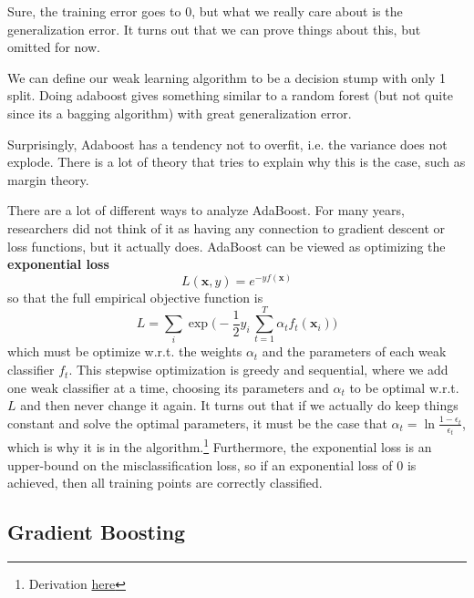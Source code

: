 \documentclass{article}
\begin{document}
    Sure, the training error goes to $0$, but what we really care about is the generalization error. It turns out that we can prove things about this, but omitted for now. 

    \begin{example}
      We can define our weak learning algorithm to be a decision stump with only 1 split. Doing adaboost gives something similar to a random forest (but not quite since its a bagging algorithm) with great generalization error. 
    \end{example}

    Surprisingly, Adaboost has a tendency not to overfit, i.e. the variance does not explode. There is a lot of theory that tries to explain why this is the case, such as margin theory. 

    There are a lot of different ways to analyze AdaBoost. For many years, researchers did not think of it as having any connection to gradient descent or loss functions, but it actually does. AdaBoost can be viewed as optimizing the \textbf{exponential loss} 
    \begin{equation}
      L(\mathbf{x}, y) = e^{-y f(\mathbf{x})} 
    \end{equation}
    so that the full empirical objective function is 
    \begin{equation}
      L = \sum_i \exp \bigg( -\frac{1}{2} y_i \, \sum_{t=1}^T \alpha_t f_t (\mathbf{x}_i)\bigg)
    \end{equation}
    which must be optimize w.r.t. the weights $\alpha_t$ and the parameters of each weak classifier $f_t$. This stepwise optimization is greedy and sequential, where we add one weak classifier at a time, choosing its parameters and $\alpha_t$ to be optimal w.r.t. $L$ and then never change it again. It turns out that if we actually do keep things constant and solve the optimal parameters, it must be the case that $\alpha_t = \ln \frac{1 - \epsilon_t}{\epsilon_t}$, which is why it is in the algorithm.\footnote{Derivation \href{https://www.cs.toronto.edu/~mbrubake/teaching/C11/Handouts/AdaBoost.pdf}{here}} Furthermore, the exponential loss is an upper-bound on the misclassification loss, so if an exponential loss of $0$ is achieved, then all training points are correctly classified. 

  \subsection{Gradient Boosting}
\end{document}
